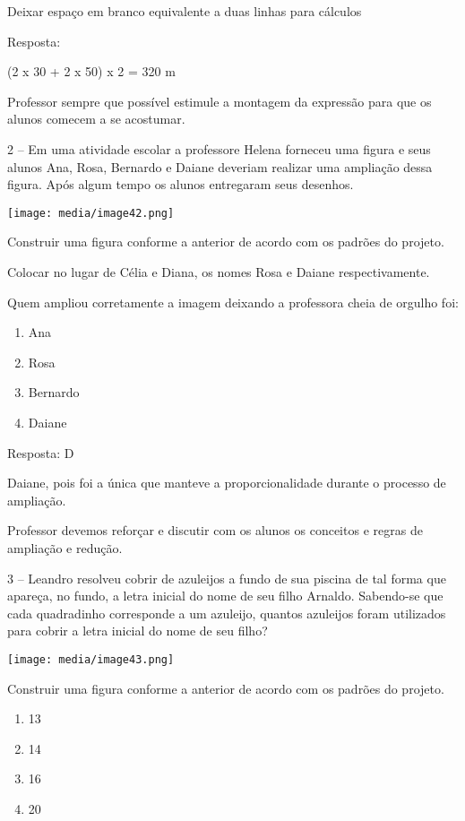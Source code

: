 Deixar espaço em branco equivalente a duas linhas para cálculos

Resposta:

(2 x 30 + 2 x 50) x 2 = 320 m

Professor sempre que possível estimule a montagem da expressão para que
os alunos comecem a se acostumar.

2 -- Em uma atividade escolar a professore Helena forneceu uma figura e
seus alunos Ana, Rosa, Bernardo e Daiane deveriam realizar uma ampliação
dessa figura. Após algum tempo os alunos entregaram seus desenhos.

\texttt{[image: media/image42.png]}

Construir uma figura conforme a anterior de acordo com os padrões do
projeto.

Colocar no lugar de Célia e Diana, os nomes Rosa e Daiane
respectivamente.

Quem ampliou corretamente a imagem deixando a professora cheia de
orgulho foi:

\begin{enumerate}
\def\labelenumi{\alph{enumi})}
\item
  Ana
\item
  Rosa
\item
  Bernardo
\item
  Daiane
\end{enumerate}

Resposta: D

Daiane, pois foi a única que manteve a proporcionalidade durante o
processo de ampliação.

Professor devemos reforçar e discutir com os alunos os conceitos e
regras de ampliação e redução.

3 -- Leandro resolveu cobrir de azuleijos a fundo de sua piscina de tal
forma que apareça, no fundo, a letra inicial do nome de seu filho
Arnaldo. Sabendo-se que cada quadradinho corresponde a um azuleijo,
quantos azuleijos foram utilizados para cobrir a letra inicial do nome
de seu filho?

\texttt{[image: media/image43.png]}

Construir uma figura conforme a anterior de acordo com os padrões do
projeto.

\begin{enumerate}
\def\labelenumi{\alph{enumi})}
\item
  13
\item
  14
\item
  16
\item
  20
\end{enumerate}

